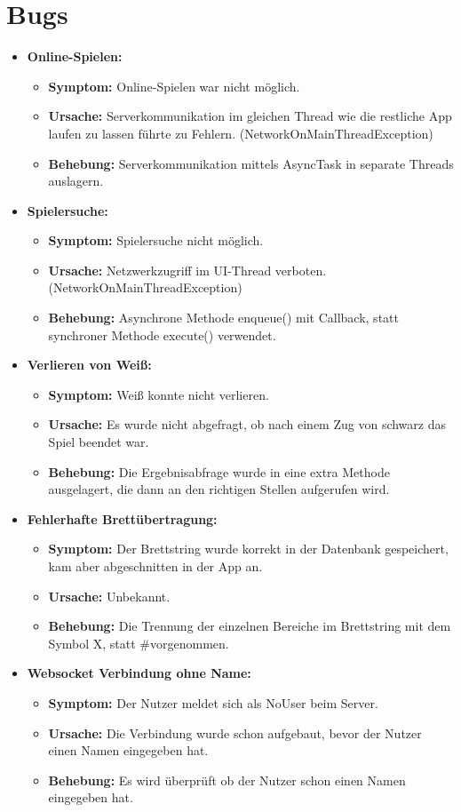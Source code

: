 \documentclass[parskip=full]{scrartcl}
\begin{document}
\section{Bugs}
\begin{itemize}
\item{\textbf{Online-Spielen:}}
	\begin{itemize}
	\item{\textbf{Symptom:}} Online-Spielen war nicht möglich.
	\item{\textbf{Ursache:}} Serverkommunikation im gleichen Thread wie die restliche App laufen zu 	lassen führte zu Fehlern. (NetworkOnMainThreadException)
	\item{\textbf{Behebung:}} Serverkommunikation mittels AsyncTask in separate Threads auslagern. 
	\end{itemize}
\item{\textbf{ Spielersuche:}} 
	\begin{itemize} 
	\item{\textbf{Symptom:}} Spielersuche nicht möglich.
	\item{\textbf{Ursache:}} Netzwerkzugriff im UI-Thread verboten. (NetworkOnMainThreadException)
	\item{\textbf{Behebung:}} Asynchrone Methode enqueue() mit Callback, statt synchroner Methode execute() verwendet. 
	\end{itemize}
\item{\textbf{Verlieren von Weiß:}}
	\begin{itemize}
	\item{\textbf{Symptom:}} Weiß konnte nicht verlieren.
	\item{\textbf{Ursache:}} Es wurde nicht abgefragt, ob nach einem Zug von schwarz das Spiel beendet war.
	\item{\textbf{Behebung:}} Die Ergebnisabfrage wurde in eine extra Methode ausgelagert, die dann an den richtigen Stellen aufgerufen wird.
	\end{itemize}
\item{\textbf{Fehlerhafte Brettübertragung:}}
	\begin{itemize}
		\item{\textbf{Symptom:}} Der Brettstring wurde korrekt in der Datenbank gespeichert, kam aber abgeschnitten in der App an.
		\item{\textbf{Ursache:}} Unbekannt.
		\item{\textbf{Behebung:}} Die Trennung der einzelnen Bereiche im Brettstring mit dem Symbol \glqq X\grqq, statt \glqq \#\grqq \space vorgenommen.
	\end{itemize}
\item{\textbf{Websocket Verbindung ohne Name:}}
\begin{itemize}
	\item{\textbf{Symptom:}} Der Nutzer meldet sich als NoUser beim Server.
	\item{\textbf{Ursache:}} Die Verbindung wurde schon aufgebaut, bevor der Nutzer einen Namen eingegeben hat.
	\item{\textbf{Behebung:}} Es wird überprüft ob der Nutzer schon einen Namen eingegeben hat.
\end{itemize}


\end{itemize}
\end{document}
